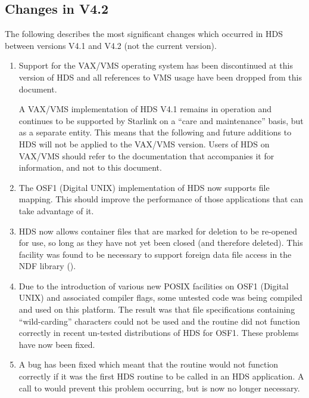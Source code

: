 \documentclass[twoside,11pt]{starlink}
\providecommand{\qt}[1]{``#1''}
\begin{document}
\subsection{Changes in V4.2}

The following describes the most significant changes which occurred in HDS
between versions V4.1 and V4.2 (not the current version).

\begin{enumerate}

\item Support for the VAX/VMS operating system has been discontinued
at this version of HDS and all references to VMS usage have been
dropped from this document.

A VAX/VMS implementation of HDS V4.1 remains in operation and
continues to be supported by Starlink on a \qt{care and maintenance}
basis, but as a separate entity. This means that the following and
future additions to HDS will not be applied to the VAX/VMS
version. Users of HDS on VAX/VMS should refer to the documentation
that accompanies it for information, and not to this document.

\item The OSF1 (Digital UNIX) implementation of HDS now supports file
mapping. This should improve the performance of those applications
that can take advantage of it.

\item HDS now allows container files that are marked for deletion to
be re-opened for use, so long as they have not yet been closed (and
therefore deleted). This facility was found to be necessary to support
foreign data file access in the NDF library ().

\item Due to the introduction of various new POSIX facilities on OSF1
(Digital UNIX) and associated compiler flags, some untested code was
being compiled and used on this platform. The result was that file
specifications containing \qt{wild-carding} characters could not be
used and the  routine did not function
correctly in recent un-tested distributions of HDS for OSF1. These
problems have now been fixed.

\item A bug has been fixed which meant that the
 routine would not function correctly if
it was the first HDS routine to be called in an HDS application. A
call to  would prevent this problem
occurring, but is now no longer necessary.


\end{enumerate}
\end{document}
